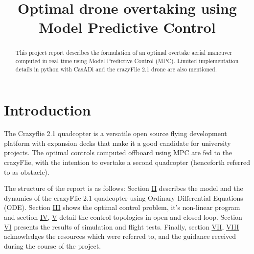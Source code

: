 \documentclass[conference]{IEEEtran}
\begin{document}
\title{Optimal drone overtaking using Model Predictive Control\\}
\author{
}

\maketitle

\begin{abstract}
This project report describes the formulation of an optimal overtake aerial maneuver computed in real time using Model Predictive Control (MPC). Limited implementation details in python with CasADi and the crazyFlie 2.1 drone are also mentioned.

\end{abstract}

\section{Introduction}\label{Introduction}
The Crazyflie 2.1 quadcopter is a versatile open source flying development platform with expansion decks that make it a good candidate for university projects. The optimal controls computed offboard using MPC are fed to the crazyFlie, with the intention to overtake a second quadcopter (henceforth referred to as obstacle).

The structure of the report is as follows: Section \hyperref[Section2]{II} describes the model and the dynamics of the crazyFlie 2.1 quadcopter using Ordinary Differential Equations (ODE). Section \hyperref[Section3]{III} shows the optimal control problem, it's non-linear program and section \hyperref[Section4]{IV}, \hyperref[Section5]{V} detail the control topologies in open and closed-loop. Section \hyperref[Section6]{VI} presents the results 
of simulation and flight tests. Finally, section \hyperref[Section7]{VII}, \hyperref[Section8]{VIII} acknowledges the resources which were referred to, and the guidance received during the course of the project.
\end{document}
